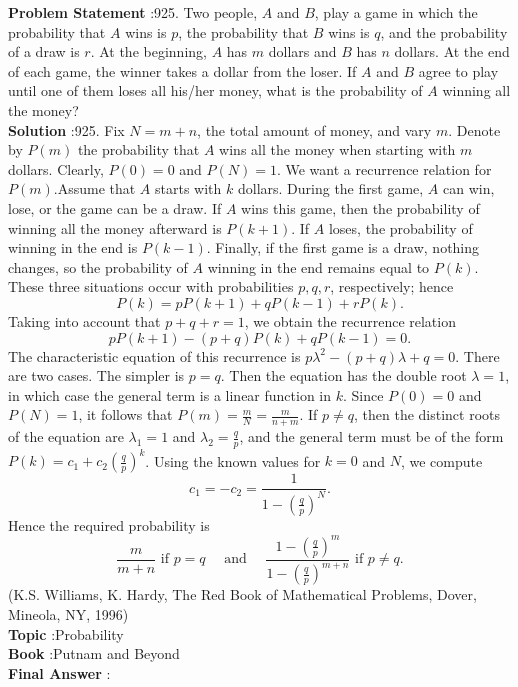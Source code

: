 \documentclass[10pt]{article}
\begin{document}
\textbf{Problem Statement} :925. Two people, $A$ and $B$, play a game in which the probability that $A$ wins is $p$, the probability that $B$ wins is $q$, and the probability of a draw is $r$. At the beginning, $A$ has $m$ dollars and $B$ has $n$ dollars. At the end of each game, the winner takes a dollar from the loser. If $A$ and $B$ agree to play until one of them loses all his/her money, what is the probability of $A$ winning all the money?\\
\textbf{Solution} :925. Fix $N=m+n$, the total amount of money, and vary $m$. Denote by $P(m)$ the probability that $A$ wins all the money when starting with $m$ dollars. Clearly, $P(0)=0$ and $P(N)=1$. We want a recurrence relation for $P(m)$.Assume that $A$ starts with $k$ dollars. During the first game, $A$ can win, lose, or the game can be a draw. If $A$ wins this game, then the probability of winning all the money afterward is $P(k+1)$. If $A$ loses, the probability of winning in the end is $P(k-1)$. Finally, if the first game is a draw, nothing changes, so the probability of $A$ winning in the end remains equal to $P(k)$. These three situations occur with probabilities $p, q, r$, respectively; hence $$ P(k)=p P(k+1)+q P(k-1)+r P(k) . $$Taking into account that $p+q+r=1$, we obtain the recurrence relation$$ p P(k+1)-(p+q) P(k)+q P(k-1)=0 . $$The characteristic equation of this recurrence is $p \lambda^{2}-(p+q) \lambda+q=0$. There are two cases. The simpler is $p=q$. Then the equation has the double root $\lambda=1$, in which case the general term is a linear function in $k$. Since $P(0)=0$ and $P(N)=1$, it follows that $P(m)=\frac{m}{N}=\frac{m}{n+m}$. If $p \neq q$, then the distinct roots of the equation are $\lambda_{1}=1$ and $\lambda_{2}=\frac{q}{p}$, and the general term must be of the form $P(k)=c_{1}+c_{2}\left(\frac{q}{p}\right)^{k}$. Using the known values for $k=0$ and $N$, we compute$$ c_{1}=-c_{2}=\frac{1}{1-\left(\frac{q}{p}\right)^{N}} . $$Hence the required probability is$$ \frac{m}{m+n} \text { if } p=q \quad \text { and } \quad \frac{1-\left(\frac{q}{p}\right)^{m}}{1-\left(\frac{q}{p}\right)^{m+n}} \text { if } p \neq q . $$(K.S. Williams, K. Hardy, The Red Book of Mathematical Problems, Dover, Mineola, NY, 1996)\\
\textbf{Topic} :Probability\\
\textbf{Book} :Putnam and Beyond\\
\textbf{Final Answer} :\\
\end{document}
